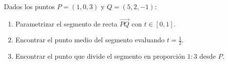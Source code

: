 Dados los puntos $P = (1, 0, 3)$ y $Q = (5, 2, -1)$:
\begin{enumerate}
    \item Parametrizar el segmento de recta $\overrightarrow{PQ}$ con $t \in [0, 1]$.
    \item Encontrar el punto medio del segmento evaluando $t = \tfrac{1}{2}$.
    \item Encontrar el punto que divide el segmento en proporción $1:3$ desde $P$.
\end{enumerate}